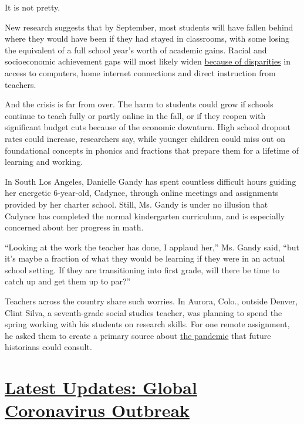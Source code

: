 It is not pretty.

New research suggests that by September, most students will have fallen
behind where they would have been if they had stayed in classrooms, with
some losing the equivalent of a full school year's worth of academic
gains. Racial and socioeconomic achievement gaps will most likely widen
\href{https://www.nytimes3xbfgragh.onion/2020/05/09/us/coronavirus-public-private-school.html}{because
of disparities} in access to computers, home internet connections and
direct instruction from teachers.

And the crisis is far from over. The harm to students could grow if
schools continue to teach fully or partly online in the fall, or if they
reopen with significant budget cuts because of the economic downturn.
High school dropout rates could increase, researchers say, while younger
children could miss out on foundational concepts in phonics and
fractions that prepare them for a lifetime of learning and working.

In South Los Angeles, Danielle Gandy has spent countless difficult hours
guiding her energetic 6-year-old, Cadynce, through online meetings and
assignments provided by her charter school. Still, Ms. Gandy is under no
illusion that Cadynce has completed the normal kindergarten curriculum,
and is especially concerned about her progress in math.

``Looking at the work the teacher has done, I applaud her,'' Ms. Gandy
said, ``but it's maybe a fraction of what they would be learning if they
were in an actual school setting. If they are transitioning into first
grade, will there be time to catch up and get them up to par?''

Teachers across the country share such worries. In Aurora, Colo.,
outside Denver, Clint Silva, a seventh-grade social studies teacher, was
planning to spend the spring working with his students on research
skills. For one remote assignment, he asked them to create a primary
source about
\href{https://www.nytimes3xbfgragh.onion/news-event/coronavirus}{the
pandemic} that future historians could consult.

\hypertarget{latest-updates-global-coronavirus-outbreak}{%
\section{\texorpdfstring{\href{https://www.nytimes3xbfgragh.onion/2020/08/04/world/coronavirus-cases.html?action=click\&pgtype=Article\&state=default\&region=MAIN_CONTENT_1\&context=storylines_live_updates}{Latest
Updates: Global Coronavirus
Outbreak}}{Latest Updates: Global Coronavirus Outbreak}}\label{latest-updates-global-coronavirus-outbreak}}

